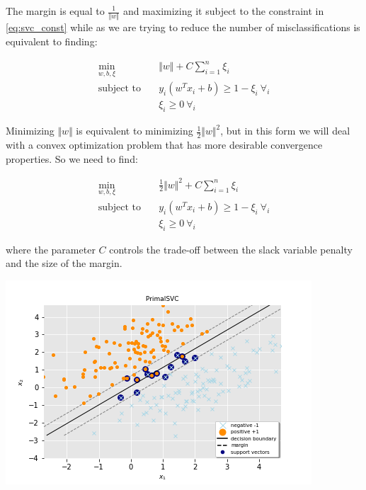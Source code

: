 The margin is equal to $\displaystyle \frac{1}{\Vert w\Vert}$ and maximizing it subject to the constraint in \ref{eq:svc_const} while as we are trying to reduce the number of misclassifications is equivalent to finding:

\begin{equation} \label{eq:svc_obj}
    \begin{aligned}
        \min_{w,b,\xi} \quad & \Vert w \Vert + C \sum_{i=1}^{n} \xi_i \\
            \textrm{subject to} \quad & y_i (w^T x_i + b) \geq 1 - \xi_i \ \forall_i \\ & \xi_i \geq 0 \ \forall_i
    \end{aligned}
\end{equation}

Minimizing $\Vert w\Vert$ is equivalent to minimizing $\displaystyle \frac{1}{2}\Vert w\Vert^{2}$, but in this form we will deal with a convex optimization problem that has more desirable convergence properties. So we need to find:

\begin{equation} \label{eq:quad_svc_obj}
    \begin{aligned}
        \min_{w,b,\xi} \quad & \frac{1}{2} \Vert w \Vert^2 + C \sum_{i=1}^{n} \xi_i \\
            \textrm{subject to} \quad & y_i (w^T x_i + b) \geq 1 - \xi_i \ \forall_i \\ & \xi_i \geq 0 \ \forall_i
    \end{aligned}
\end{equation}

where the parameter $C$ controls the trade-off between the slack variable penalty and the size of the margin.

\includegraphics[scale=0.5]{img/svc_hyperplane.png}

